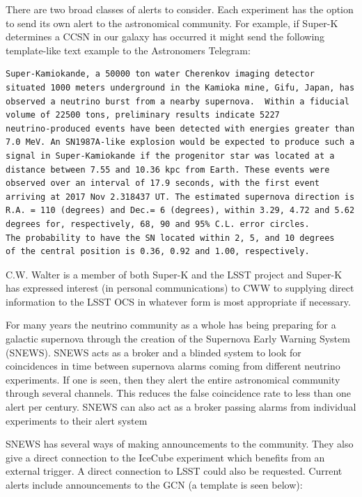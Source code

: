 \documentclass[11pt, letterpaper]{article}
\newcommand{\superk}  {Super\nobreakdash-K\xspace}
\begin{document}
There are two broad classes of alerts to consider.  Each experiment
has the option to send its own alert to the astronomical community.
For example, if \superk determines a CCSN in our galaxy has occurred
it might send the following template-like text example to the Astronomers
Telegram:

\begin{verbatim}
Super-Kamiokande, a 50000 ton water Cherenkov imaging detector
situated 1000 meters underground in the Kamioka mine, Gifu, Japan, has
observed a neutrino burst from a nearby supernova.  Within a fiducial
volume of 22500 tons, preliminary results indicate 5227
neutrino-produced events have been detected with energies greater than
7.0 MeV. An SN1987A-like explosion would be expected to produce such a
signal in Super-Kamiokande if the progenitor star was located at a
distance between 7.55 and 10.36 kpc from Earth. These events were
observed over an interval of 17.9 seconds, with the first event
arriving at 2017 Nov 2.318437 UT. The estimated supernova direction is
R.A. = 110 (degrees) and Dec.= 6 (degrees), within 3.29, 4.72 and 5.62
degrees for, respectively, 68, 90 and 95% C.L. error circles. 
The probability to have the SN located within 2, 5, and 10 degrees 
of the central position is 0.36, 0.92 and 1.00, respectively.
\end{verbatim}

C.W. Walter is a member of both \superk and the LSST project and
\superk has expressed interest (in personal communications) to CWW to
supplying direct information to the LSST OCS in whatever form is most
appropriate if necessary.

For many years the neutrino community as a whole has being preparing
for a galactic supernova through the creation of the Supernova Early
Warning System (SNEWS).  SNEWS acts as a
broker and a blinded system to look for coincidences in time between
supernova alarms coming from different neutrino experiments. If one is
seen, then they alert the entire astronomical community through several
channels. This reduces the false coincidence rate to less than one
alert per century. SNEWS can also act as a broker passing alarms from
individual experiments to their alert system

SNEWS has several ways of making announcements to the community.  They
also give a direct connection to the IceCube experiment which benefits
from an external trigger.  A direct connection to LSST could also be
requested.  Current  alerts include announcements to the GCN (a
template is seen below):
\end{document}
